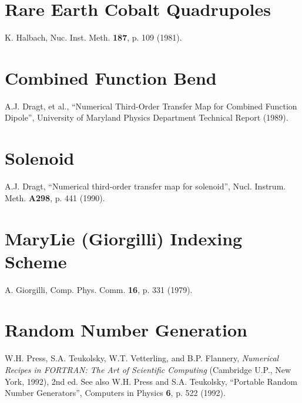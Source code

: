 \section{Rare Earth Cobalt Quadrupoles}
\begin{description}
\item K. Halbach, Nuc. Inst. Meth. {\bf 187}, p. 109 (1981).
\end{description}
\section{Combined Function Bend}
\begin{description}
\item A.J. Dragt, et al., ``Numerical Third-Order Transfer Map for Combined Function Dipole'', University of Maryland Physics Department Technical Report (1989).
\end{description}
\section{Solenoid}
\begin{description}
\item A.J. Dragt, ``Numerical third-order transfer map for solenoid'', Nucl. Instrum. Meth. {\bf A298}, p. 441 (1990).
\end{description}
\section{MaryLie (Giorgilli) Indexing Scheme}
\begin{description}
\item A. Giorgilli, Comp. Phys. Comm. {\bf 16}, p. 331 (1979).
\end{description}
\section{Random Number Generation}
\begin{description}
\item W.H. Press, S.A. Teukolsky, W.T. Vetterling, and B.P. Flannery,
{\em Numerical Recipes in FORTRAN:  The Art of Scientific Computing} (Cambridge U.P., New York, 1992), 2nd ed.  See also W.H. Press and S.A. Teukolsky, ``Portable Random Number Generators'', Computers in Physics {\bf 6}, p. 522 (1992).
\end{description}



